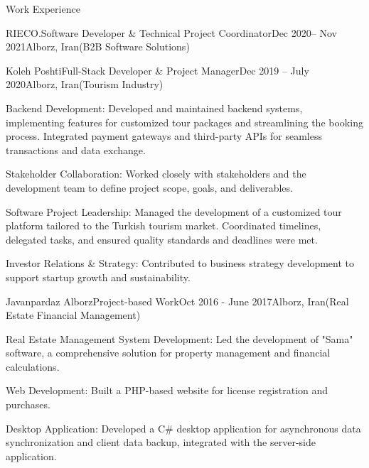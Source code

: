 \documentclass[]{kyvernitis-resume}
\begin{document}
\begin{section}{Work Experience}
\begin{subsection}{RIECO.}{Software Developer  \& Technical Project Coordinator}{Dec 2020-- Nov 2021}{Alborz, Iran}{(B2B Software Solutions)}
    \end{subsection}
    
    \begin{subsection}{Koleh Poshti}{Full-Stack Developer \& Project Manager}{Dec 2019 -- July 2020}{Alborz, Iran}{(Tourism Industry)}

        	\item Backend Development: Developed and maintained backend systems, implementing features for customized tour packages and streamlining the booking process. Integrated payment gateways and third-party APIs for seamless transactions and data exchange.
        	\item Stakeholder Collaboration: Worked closely with stakeholders and the development team to define project scope, goals, and deliverables.
        	\item Software Project Leadership: Managed the development of a customized tour platform tailored to the Turkish tourism market. Coordinated timelines, delegated tasks, and ensured quality standards and deadlines were met.
        	\item Investor Relations \& Strategy: Contributed to business strategy development to support startup growth and sustainability.	
    \end{subsection}

\hfill

    \begin{subsection}{Javanpardaz Alborz}{Project-based Work}{Oct 2016 - June 2017}{Alborz, Iran}{(Real Estate Financial Management)}
	\item Real Estate Management System Development: Led the development of "Sama" software, a comprehensive solution for property management and financial calculations.
	\item Web Development: Built a PHP-based website for license registration and purchases.
	\item Desktop Application: Developed a C\# desktop application for asynchronous data synchronization and client data backup, integrated with the server-side application.

    \end{subsection}



\end{section}
\end{document}
